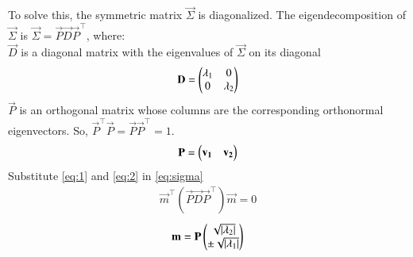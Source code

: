 \documentclass[journal]{IEEEtran}
\begin{document}
To solve this, the symmetric matrix $\vec{\Sigma}$ is diagonalized. The eigendecomposition of $\vec{\Sigma}$ is $\vec{\Sigma} = \vec{P}\vec{D}\vec{P}^\top$, where: \\
$\vec{D}$ is a diagonal matrix with the eigenvalues of $\vec{\Sigma}$ on its diagonal
\begin{align}
    \mathbf{D} = \begin{pmatrix}\lambda_1 & 0 \\ 0 & \lambda_2\end{pmatrix} \label{eq:1}
\end{align}
$\vec{P}$ is an orthogonal matrix whose columns are the corresponding orthonormal eigenvectors. So, $\vec{P}^\top \vec{P} = \vec{P}\vec{P}^\top = 1$.
\begin{align}
    \mathbf{P} = \begin{pmatrix}\mathbf{v_1} & \mathbf{v_2}\end{pmatrix} \label{eq:2}
\end{align}
Substitute \eqref{eq:1} and \eqref{eq:2} in \eqref{eq:sigma}
\begin{align}
    \vec{m}^\top (\vec{P}\vec{D}\vec{P}^\top) \vec{m} = 0
\end{align}
\begin{align}
	\mathbf{m} = \mathbf{P}\begin{pmatrix}\sqrt{\left\vert\lambda_2\right\vert} \\ \pm\sqrt{\left\vert\lambda_1\right\vert}\end{pmatrix} \label{eq:eigenmat}
\end{align}
\end{document}
